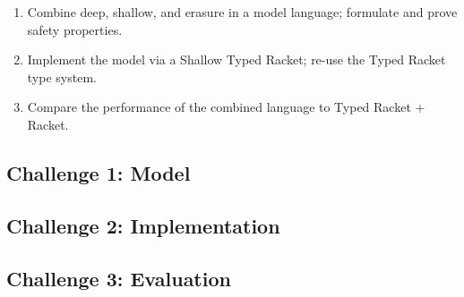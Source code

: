\begin{enumerate}
\item Combine deep, shallow, and erasure in a model language; formulate and prove safety properties.
\item Implement the model via a Shallow Typed Racket; re-use the Typed Racket type system.
\item Compare the performance of the combined language to Typed Racket + Racket.
\end{enumerate}

\subsection{Challenge 1: Model}


\subsection{Challenge 2: Implementation}


\subsection{Challenge 3: Evaluation}


